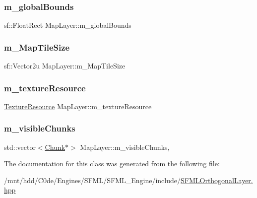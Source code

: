 \subsubsection{\texorpdfstring{m\+\_\+global\+Bounds}{m\_globalBounds}}
{\footnotesize\ttfamily sf\+::\+Float\+Rect Map\+Layer\+::m\+\_\+global\+Bounds\hspace{0.3cm}{\ttfamily [private]}}

\mbox{\label{classMapLayer_a9863689eb080d27e7a99dea7c20aee41}} 
\subsubsection{\texorpdfstring{m\+\_\+\+Map\+Tile\+Size}{m\_MapTileSize}}
{\footnotesize\ttfamily sf\+::\+Vector2u Map\+Layer\+::m\+\_\+\+Map\+Tile\+Size\hspace{0.3cm}{\ttfamily [private]}}

\mbox{\label{classMapLayer_ad7cade67df5e55b3c6a960476e6d2cb9}} 
\subsubsection{\texorpdfstring{m\+\_\+texture\+Resource}{m\_textureResource}}
{\footnotesize\ttfamily \hyperlink{classMapLayer_a64011087426e436e3cb8374570378d68}{Texture\+Resource} Map\+Layer\+::m\+\_\+texture\+Resource\hspace{0.3cm}{\ttfamily [private]}}

\mbox{\label{classMapLayer_a74941b5479affea58ea8a3068770d430}} 
\subsubsection{\texorpdfstring{m\+\_\+visible\+Chunks}{m\_visibleChunks}}
{\footnotesize\ttfamily std\+::vector$<$\hyperlink{classMapLayer_1_1Chunk}{Chunk}$\ast$$>$ Map\+Layer\+::m\+\_\+visible\+Chunks\hspace{0.3cm}{\ttfamily [mutable]}, {\ttfamily [private]}}



The documentation for this class was generated from the following file\+:\begin{DoxyCompactItemize}
\item 
/mnt/hdd/\+C0de/\+Engines/\+S\+F\+M\+L/\+S\+F\+M\+L\+\_\+\+Engine/include/\hyperlink{SFMLOrthogonalLayer_8hpp}{S\+F\+M\+L\+Orthogonal\+Layer.\+hpp}\end{DoxyCompactItemize}
